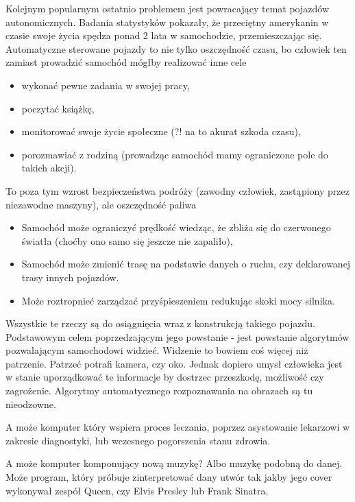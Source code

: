\documentclass[10pt,a4paper]{book}
\begin{document}
\begin{problem*}
Kolejnym popularnym ostatnio problemem jest powracający temat pojazdów autonomicznych. Badania statystyków pokazały, że przeciętny amerykanin w czasie swoje życia spędza ponad 2 lata w samochodzie, przemieszczając się. Automatyczne sterowane pojazdy to nie tylko oszczędność czasu, bo człowiek ten zamiast prowadzić samochód mógłby realizować inne cele 
\begin{itemize}
\item wykonać pewne zadania w swojej pracy,
\item poczytać książkę,
\item monitorować swoje życie społeczne (?! na to akurat szkoda czasu),
\item porozmawiać z rodziną (prowadząc samochód mamy ograniczone pole do takich akcji).
\end{itemize}
To poza tym wzrost bezpieczeństwa podróży (zawodny człowiek, zastąpiony przez niezawodne maszyny), ale oszczędność paliwa 
\begin{itemize}
\item Samochód może ograniczyć prędkość wiedząc, że zbliża się do czerwonego światła (choćby ono samo się jeszcze nie zapaliło),
\item Samochód może zmienić trasę na podstawie danych o ruchu, czy deklarowanej trasy innych pojazdów.
\item Może roztropnieć zarządzać przyśpieszeniem redukując skoki mocy silnika.
\end{itemize}
Wszystkie te rzeczy są do osiągnięcia wraz z konstrukcją takiego pojazdu. Podstawowym celem poprzedzającym jego powstanie - jest powstanie algorytmów pozwalającym samochodowi widzieć. Widzenie to bowiem coś więcej niż patrzenie. Patrzeć potrafi kamera, czy oko. Jednak dopiero umysł człowieka jest w stanie uporządkować te informacje by dostrzec przeszkodę, możliwość czy zagrożenie. Algorytmy automatycznego rozpoznawania na obrazach są tu nieodzowne.  
\end{problem*}

\begin{problem*}
A może komputer który wspiera proces leczania, poprzez asystowanie lekarzowi w zakresie diagnostyki, lub wczesnego pogorszenia stanu zdrowia.
\end{problem*}

\begin{problem*}
A może komputer komponujący nową muzykę? Albo muzykę podobną do danej. Może program, który próbuje zinterpretować dany utwór tak jakby jego cover wykonywał zespół Queen, czy Elvis Presley lub Frank Sinatra.
\end{problem*}
\end{document}
